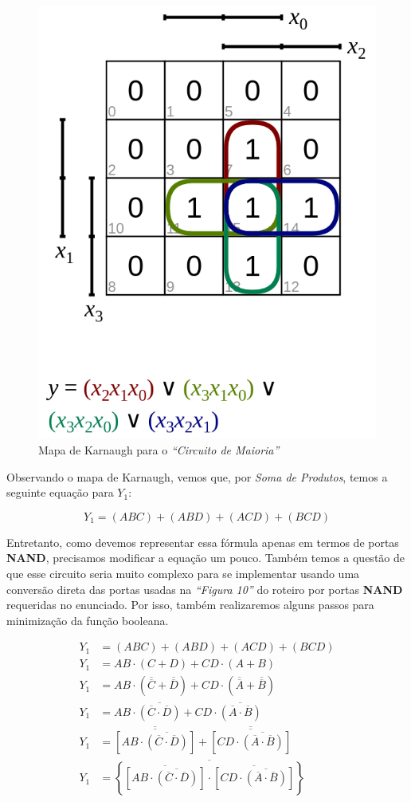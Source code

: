 \documentclass[12pt]{article}
\begin{document}
\begin{figure}[H]
    \centering
    \includegraphics[width=.5\textwidth]{Exp03/2_1_karnaugh_map.png}
    \caption{Mapa de Karnaugh para o \textit{``Circuito de Maioria''}}\label{fig:2_1_karnaugh_map.png}
\end{figure}

Observando o mapa de Karnaugh, vemos que, por \textit{Soma de Produtos}, temos a seguinte equação para \(Y_{1}\):

\begin{equation}
  Y_{1} = (ABC) + (ABD) + (ACD) + (BCD)
\end{equation}

Entretanto, como devemos representar essa fórmula apenas em termos de portas
\textbf{NAND}, precisamos modificar a equação um pouco. Também temos a questão
de que esse circuito seria muito complexo para se implementar usando uma
conversão direta das portas usadas na \textit{``Figura 10''} do roteiro por
portas \textbf{NAND} requeridas no enunciado. Por isso, também realizaremos
alguns passos para minimização da função booleana.

\begin{align}
  Y_{1} &= (ABC) + (ABD) + (ACD) + (BCD)\\
  Y_{1} &= AB \cdot (C + D) + CD \cdot (A + B)\\
  Y_{1} &= AB \cdot (\overline{\overline{C}} + \overline{\overline{D}}) + CD \cdot (\overline{\overline{A}} + \overline{\overline{B}})\\
  Y_{1} &= AB \cdot \overline{ \left( \overline{C} \cdot \overline{D} \right) } + CD \cdot \overline{ \left( \overline{A} \cdot \overline{B} \right) }\\
  Y_{1} &= \overline{ \overline{ \left[ AB \cdot \overline{ \left( \overline{C} \cdot \overline{D} \right) } \right] } } + \overline{ \overline{ \left[ CD \cdot \overline{ \left( \overline{A} \cdot \overline{B} \right) } \right] } } \\
  Y_{1} &= \overline{ \left\{ \overline{ \left[AB \cdot \overline{ \left( \overline{C} \cdot \overline{D} \right) } \right] } \cdot \overline{ \left[ CD \cdot \overline{ \left( \overline{A} \cdot \overline{B} \right) } \right] } \right\} } \label{eq:2.1_NAND}
\end{align}
\end{document}

